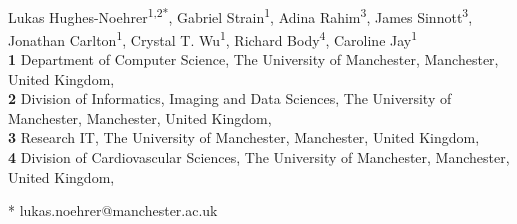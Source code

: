 \documentclass[
  10pt,
  letterpaper,
]{article}
\begin{document}
\vspace*{0.2in}

\begin{flushleft}
{\Large
\textbf{} %
}
\newline
\\
Lukas Hughes-Noehrer\textsuperscript{1,2*}, Gabriel
Strain\textsuperscript{1}, Adina Rahim\textsuperscript{3}, James
Sinnott\textsuperscript{3}, Jonathan Carlton\textsuperscript{1}, Crystal
T. Wu\textsuperscript{1}, Richard Body\textsuperscript{4}, Caroline
Jay\textsuperscript{1}
\\
\bigskip
\textbf{1} Department of Computer Science, The University of
Manchester, Manchester, United Kingdom, \\ \textbf{2} Division of
Informatics, Imaging and Data Sciences, The University of
Manchester, Manchester, United Kingdom, \\ \textbf{3} Research IT, The
University of Manchester, Manchester, United
Kingdom, \\ \textbf{4} Division of Cardiovascular Sciences, The
University of Manchester, Manchester, United Kingdom, 
\bigskip

% 
%





* lukas.noehrer@manchester.ac.uk

\end{flushleft}
\end{document}
